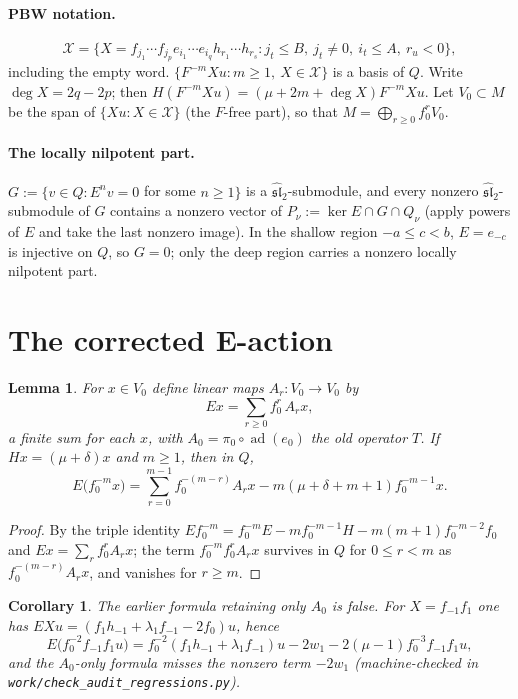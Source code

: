 \documentclass[11pt]{article}
\newcommand{\g}{\widehat{\mathfrak{sl}}_2}
\newcommand{\ad}{\operatorname{ad}}
\newtheorem{lemma}[theorem]{Lemma}
\newtheorem{corollary}[theorem]{Corollary}
\begin{document}
\paragraph{PBW notation.}
\[
 \mathcal X=\Big\{X=f_{j_1}\cdots f_{j_p}e_{i_1}\cdots e_{i_q}h_{r_1}\cdots
 h_{r_s}:j_t\le B,\ j_t\ne0,\ i_t\le A,\ r_u<0\Big\},
\]
including the empty word. $\{F^{-m}Xu:m\ge1,\ X\in\mathcal X\}$ is a basis
of $Q$. Write $\deg X=2q-2p$; then $H(F^{-m}Xu)=(\mu+2m+\deg X)F^{-m}Xu$.
Let $V_0\subset M$ be the span of $\{Xu:X\in\mathcal X\}$ (the $F$-free
part), so that $M=\bigoplus_{r\ge0}f_0^rV_0$.

\paragraph{The locally nilpotent part.}
$G:=\{v\in Q:E^nv=0$ for some $n\ge1\}$ is a $\g$-submodule, and every
nonzero $\g$-submodule of $G$ contains a nonzero vector of
$P_\nu:=\ker E\cap G\cap Q_\nu$ (apply powers of $E$ and take the last
nonzero image). In the shallow region $-a\le c<b$, $E=e_{-c}$ is injective
on $Q$, so $G=0$; only the deep region carries a nonzero locally nilpotent
part.

\section{The corrected E-action}

\begin{lemma}\label{lem:Eaction}
For $x\in V_0$ define linear maps $A_r:V_0\to V_0$ by
\[
 Ex=\sum_{r\ge0}f_0^r\,A_rx,
\]
a finite sum for each $x$, with $A_0=\pi_0\circ\ad(e_0)$ the old operator
$T$. If $Hx=(\mu+\delta)x$ and $m\ge1$, then in $Q$,
\begin{equation}\label{eq:Eaction}
 E\bigl(f_0^{-m}x\bigr)
 =\sum_{r=0}^{m-1}f_0^{-(m-r)}A_rx
 -m(\mu+\delta+m+1)f_0^{-m-1}x.
\end{equation}
\end{lemma}

\begin{proof}
By the triple identity $Ef_0^{-m}=f_0^{-m}E-mf_0^{-m-1}H-m(m+1)f_0^{-m-2}f_0$
and $Ex=\sum_rf_0^rA_rx$; the term $f_0^{-m}f_0^rA_rx$ survives in $Q$ for
$0\le r<m$ as $f_0^{-(m-r)}A_rx$, and vanishes for $r\ge m$.
\end{proof}

\begin{corollary}\label{cor:counterexample}
The earlier formula retaining only $A_0$ is false. For $X=f_{-1}f_1$ one has
$EXu=(f_1h_{-1}+\lambda_1f_{-1}-2f_0)u$, hence
\[
 E\bigl(f_0^{-2}f_{-1}f_1u\bigr)
 =f_0^{-2}(f_1h_{-1}+\lambda_1f_{-1})u
 -2w_1-2(\mu-1)f_0^{-3}f_{-1}f_1u,
\]
and the $A_0$-only formula misses the nonzero term $-2w_1$ (machine-checked
in \texttt{work/check\_audit\_regressions.py}).
\end{corollary}
\end{document}
